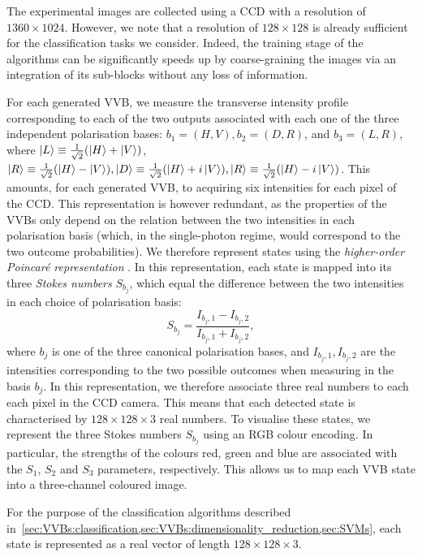 The experimental images are collected using a \ac{CCD} with a resolution of $1360 \times 1024$. 
However, we note that a resolution of $128 \times 128$ is already sufficient for the classification tasks we consider. Indeed, the training stage of the algorithms can be significantly speeds up by coarse-graining the images via an integration of its sub-blocks without any loss of information. 

For each generated \ac{VVB}, we measure the transverse intensity profile corresponding to each of the two outputs associated with each one of the three independent polarisation bases: $b_1=(H,V), b_2=(D,R)$, and $b_3=(L,R)$, where $\ket L\equiv \frac{1}{\sqrt2}(\ket H + \ket V)$, $\ket R\equiv \frac{1}{\sqrt2}(\ket H - \ket V), \ket D\equiv \frac{1}{\sqrt2}(\ket H + i \ket V), \ket R\equiv \frac{1}{\sqrt2}(\ket H - i \ket V)$.
This amounts, for each generated \ac{VVB}, to acquiring six intensities for each pixel of the \ac{CCD}. This representation is however redundant, as the properties of the VVBs only depend on the relation between the two intensities in each polarisation basis (which, in the single-photon regime, would correspond to the two outcome probabilities).
We therefore represent states using the \emph{higher-order Poincar\'e representation} \cite{milione2011higherorder,cardano2012polarization}. In this representation, each state is mapped into its three \emph{Stokes numbers} $S_{b_j}$, which equal the difference between the two intensities in each choice of polarisation basis:
\begin{equation}
  S_{b_j} = \frac{I_{b_j,1} - I_{b_j,2}}{I_{b_j,1} + I_{b_j,2}},
\end{equation}
where $b_j$ is one of the three canonical polarisation bases, and $I_{b_j,1}, I_{b_j,2}$ are the intensities corresponding to the two possible outcomes when measuring in the basis $b_j$.
In this representation, we therefore associate three real numbers to each each pixel in the \ac{CCD} camera. This means that each detected state is characterised by $128\times128\times3$ real numbers. To visualise these states, we represent the three Stokes numbers $S_{b_j}$ using an RGB colour encoding. In particular, the strengths of the colours red, green and blue are associated with the $S_{1}$, $S_{2}$ and $S_{3}$ parameters,  respectively.
This allows us to map each VVB state into a three-channel coloured image.

For the purpose of the classification algorithms described in~\cref{sec:VVBs:classification,sec:VVBs:dimensionality_reduction,sec:SVMs}, each state is represented as a real vector of length $128\times128\times 3$.



